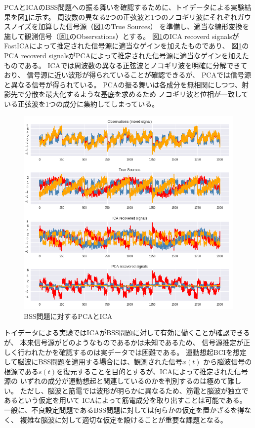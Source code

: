 PCAとICAのBSS問題への振る舞いを確認するために、トイデータによる実験結果を図\ref{fig:bss}に示す。
周波数の異なる2つの正弦波と1つのノコギリ波にそれぞれガウスノイズを加算した信号源（図\ref{fig:bss}のTrue Sources）
を準備し、適当な線形変換を施して観測信号（図\ref{fig:bss}のObservations）とする。
図\ref{fig:bss}のICA recoverd signalsがFastICAによって推定された信号源に適当なゲインを加えたものであり、
図\ref{fig:bss}のPCA recoverd signalsがPCAによって推定された信号源に適当なゲインを加えたものである。
ICAでは周波数の異なる正弦波とノコギリ波を明確に分解できており、
信号源に近い波形が得られていることが確認できるが、
PCAでは信号源と異なる信号が得られている。
PCAの振る舞いは各成分を無相関にしつつ、射影先で分散を最大化するような基底を求めるため
ノコギリ波と位相が一致している正弦波を1つの成分に集約してしまっている。

\begin{figure}
    \centering
    \includegraphics[width=13cm]{images/bss.png}
    \caption{BSS問題に対するPCAとICA}
    \label{fig:bss}
\end{figure}

トイデータによる実験ではICAがBSS問題に対して有効に働くことが確認できるが、
本来信号源がどのようなものであるかは未知であるため、
信号源推定が正しく行われたかを確認するのは実データでは困難である。
運動想起BCIを想定して脳波にBSS問題を適用する場合には、観測された信号\(x(t)\)
から脳波信号の根源である\(s(t)\)を復元することを目的とするが、ICAによって推定された信号源の
いずれの成分が運動想起と関連しているのかを判別するのは極めて難しい。
ただし、脳波と筋電では波形が明らかに異なるため、筋電と脳波が独立であるという仮定を用いて
ICAによって筋電成分を取り出すことは可能である。
一般に、不良設定問題であるBSS問題に対しては何らかの仮定を置かざるを得なく、
複雑な脳波に対して適切な仮定を設けることが重要な課題となる。
